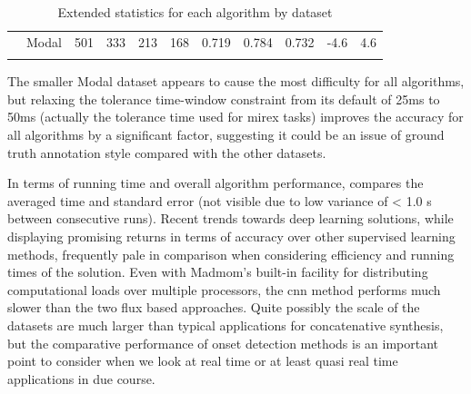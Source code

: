 {\begin{table}
\begin{threeparttable}
\begin{centering}
\begin{tabular}{l l l l l l l l l l l}
          & Modal   & 501    & 333   & 213  & 168   & 0.719     & 0.784  & 0.732     & -4.6 & 4.6 \\
				\tablebot		
			\end{tabular}
			\par \end{centering}		
		\begin{tablenotes}
			\small
		\end{tablenotes}
			\caption[Extended statistics for each algorithm by dataset]{Extended statistics for each algorithm by dataset}
			\label{tab:extended_onset_statistics}
	\end{threeparttable}
\end{table}

The smaller Modal dataset appears to cause the most difficulty for all algorithms, but relaxing the tolerance time-window constraint from its default of 25ms to 50ms (actually the tolerance time used for \acrshort{mirex} tasks) improves the accuracy for all algorithms by a significant factor, suggesting it could be an issue of ground truth annotation style compared with the other datasets.

In terms of running time and overall algorithm performance,  compares the averaged time and standard error (not visible due to low variance of < 1.0 s between consecutive runs). Recent trends towards deep learning solutions, while displaying promising returns in terms of accuracy over other supervised learning methods, frequently pale in comparison when considering efficiency and running times of the solution. Even with Madmom's built-in facility for distributing computational loads over multiple processors, the \acrshort{cnn} method performs much slower than the two flux based approaches. Quite possibly the scale of the datasets are much larger than typical applications for concatenative synthesis, but the comparative performance of onset detection methods is an important point to consider when we look at real time or at least quasi real time applications in due course.

}
